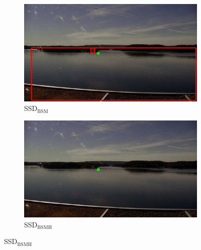 \begin{figure}[h!]
\begin{subfigure}{.5\textwidth}
  \centering
  \includegraphics[width=0.9\linewidth]{results/case_buildings/bigbox_bcbf/SSD2/selected_08_07_frame0290.jpg}
  \caption{SSD$_{\text{BSM}}$}
  \label{fig:sfig1}
\end{subfigure}%
\begin{subfigure}{.5\textwidth}
  \centering
  \includegraphics[width=.9\linewidth]{results/case_buildings/bigbox_bcbf/SSD3/selected_08_07_frame0290.jpg}
  \caption{SSD$_{\text{BSMH}}$}
  \label{fig:sfig2}
\end{subfigure}

\end{figure}

